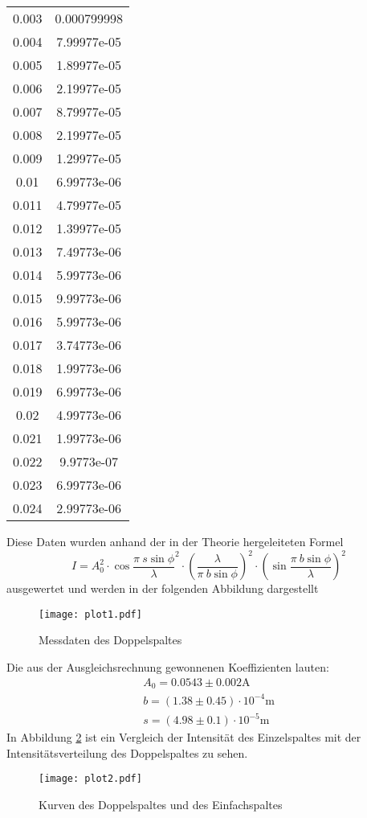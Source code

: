 \begin{table}[H]
\begin{tabular}{c c}
  0.003       & 0.000799998 \\
  0.004       & 7.99977e-05 \\
  0.005       & 1.89977e-05 \\
  0.006       & 2.19977e-05 \\
  0.007       & 8.79977e-05 \\
  0.008       & 2.19977e-05 \\
  0.009       & 1.29977e-05 \\
  0.01        & 6.99773e-06 \\
  0.011       & 4.79977e-05 \\
  0.012       & 1.39977e-05 \\
  0.013       & 7.49773e-06 \\
  0.014       & 5.99773e-06 \\
  0.015       & 9.99773e-06 \\
  0.016       & 5.99773e-06 \\
  0.017       & 3.74773e-06 \\
  0.018       & 1.99773e-06 \\
  0.019       & 6.99773e-06 \\
  0.02        & 4.99773e-06 \\
  0.021       & 1.99773e-06 \\
  0.022       & 9.9773e-07  \\
  0.023       & 6.99773e-06 \\
  0.024       & 2.99773e-06 \\
  \bottomrule
  \end{tabular}
  \end{table}
  Diese Daten wurden anhand der in der Theorie hergeleiteten Formel 
  \begin{equation*}
    I= A_0^2\cdot \cos{\dfrac{\pi\ s \sin{\phi}}{\lambda}}^2 \cdot
    (\dfrac{\lambda}{\pi \ b \sin{\phi}})^2 \cdot (\sin{\dfrac{\pi\ b \sin{\phi}}{\lambda}})^2
  \end{equation*}
  ausgewertet und werden in der folgenden Abbildung dargestellt
  \begin{figure}
    \centering
    \texttt{[image: plot1.pdf]}
    \caption{Messdaten des Doppelspaltes}
    \label{fig:p}
  \end{figure}
  Die aus der Ausgleichsrechnung gewonnenen Koeffizienten lauten:
  \begin{align*}
    A_0 = 0.0543 \pm 0.002 \si{\ampere}\\
    b = (1.38 \pm 0.45)\cdot 10^{-4} \si{\metre}\\
    s = (4.98 \pm 0.1) \cdot 10^{-5} \si{\metre}
  \end{align*}
  In Abbildung \ref{fig:verleich} ist ein Vergleich der Intensität des Einzelspaltes mit der 
  Intensitätsverteilung des Doppelspaltes zu sehen.
  \begin{figure}
    \centering
    \texttt{[image: plot2.pdf]}
    \caption{Kurven des Doppelspaltes und des Einfachspaltes}
    \label{fig:verleich}
  \end{figure}